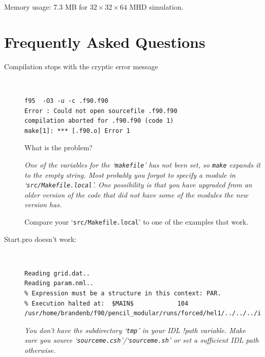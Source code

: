 \documentclass[12pt,twoside,notitlepage,a4paper]{article}
\makeatletter
\newcommand{\code}[1]{\texttt{#1}}
\newcommand{\var}[1]{\textsl{#1}\index{#1@\emph{#1}}\/}
\newcommand{\file}[1]{`\texttt{#1}'}
\newcommand{\command}[1]{\code{#1}\index{#1}}
\newcommand{\cmd}[1]{\command{#1}}
\makeatother
\begin{document}
Memory usage: 7.3 MB for $32\times32\times64$ MHD simulation.




\section{Frequently Asked Questions}

\begin{description}

\item[Compilation stops with the cryptic error message]{\bfseries \ 

    \begin{Verbatim}
f95  -O3 -u -c .f90.f90
Error : Could not open sourcefile .f90.f90
compilation aborted for .f90.f90 (code 1)
make[1]: *** [.f90.o] Error 1
    \end{Verbatim}
  
    What is the problem?}
  \medskip

  {\em
  One of the variables for the \file{makefile} has not been set, so
  \cmd{make} expands it to the empty string.
  Most probably you forgot to specify a module in
  \file{src/Makefile.local}. One possibility is that you have upgraded
  from an older version of the code that did not have some of the modules
  the new version has.
  
  Compare your \file{src/Makefile.local} to one of the examples that
  work.
  }

\item[Start.pro doesn't work:]{\bfseries \

    \begin{Verbatim}
Reading grid.dat..
Reading param.nml..
% Expression must be a structure in this context: PAR.
% Execution halted at:  $MAIN$            104
/usr/home/brandenb/f90/pencil_modular/runs/forced/hel1/../../../idl/start.pro
    \end{Verbatim}
    }
    \medskip

    {\em
    You don't have the subdirectory \file{tmp} in your IDL \var{!path}
    variable. Make sure you source \file{sourceme.csh}/\file{sourceme.sh}
    or set a sufficient IDL path otherwise.
    }

\end{description}


\end{document}
